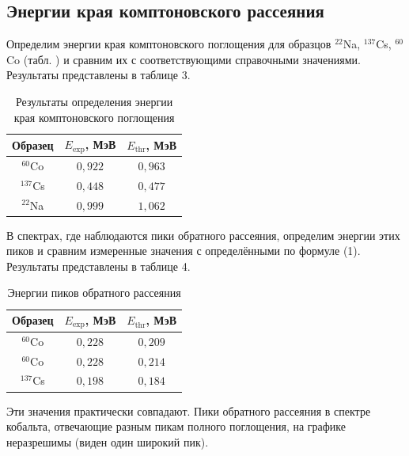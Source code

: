 \documentclass[a4paper]{article}
\begin{document}
\newpage

\subsection{Энергии края комптоновского рассеяния}

\noindent Определим энергии края комптоновского поглощения для образцов $^{22}$Na, $^{137}$Cs, $^{60}$Co (табл. ) и сравним их с соответствующими справочными значениями. Результаты представлены в таблице 3.

\begin{table}[!ht]
    \centering
    \caption{Результаты определения энергии края комптоновского поглощения}
    \begin{tabular}{|c|c|c|}
    \hline
    Образец & $E_{\text{exp}}$, МэВ & $E_{\text{thr}}$, МэВ \\ \hline
    $^{60}$Co      & $0,922$               & $0,963$               \\ \hline
    $^{137}$Cs      & $0,448$               & $0,477$               \\ \hline
    $^{22}$Na      & $0,999$               & $1,062$               \\ \hline
    \end{tabular}
    \end{table}

\noindent В спектрах, где наблюдаются пики обратного рассеяния, определим энергии этих пиков и сравним измеренные значения с определёнными по формуле (1). Результаты представлены в таблице 4. 

\begin{table}[!ht]
    \centering
    \caption{Энергии пиков обратного рассеяния}
    \begin{tabular}{|c|c|c|}
    \hline
    Образец & $E_{\text{exp}}$, МэВ & $E_{\text{thr}}$, МэВ \\ \hline
    $^{60}$Co      & $0,228$               & $0,209$               \\ \hline
    $^{60}$Co      & $0,228$               & $0,214$               \\ \hline
    $^{137}$Cs      & $0,198$               & $0,184$               \\ \hline
    \end{tabular}
\end{table}

\noindent Эти значения практически совпадают. Пики обратного рассеяния в спектре кобальта, отвечающие разным пикам полного поглощения, на графике неразрешимы (виден один широкий пик).
\end{document}
